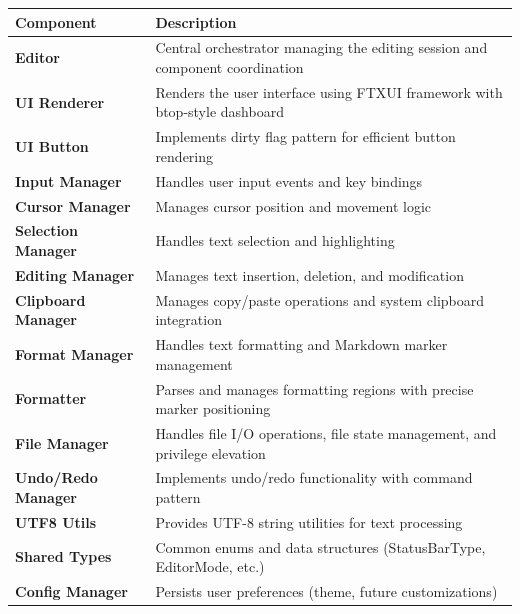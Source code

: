 \documentclass[12pt,a4paper,oneside,openany]{report}
\begin{document}
\begin{table}[H]
	\centering
	\begin{tabular}{|p{5cm}|p{8cm}|}
		\hline
		\textbf{Component}         & \textbf{Description}                                                         \\
		\hline
		\textbf{Editor}            & Central orchestrator managing the editing session and component coordination \\
		\hline
		\textbf{UI Renderer}       & Renders the user interface using FTXUI framework with btop-style dashboard   \\
		\hline
		\textbf{UI Button}         & Implements dirty flag pattern for efficient button rendering                 \\
		\hline
		\textbf{Input Manager}     & Handles user input events and key bindings                                   \\
		\hline
		\textbf{Cursor Manager}    & Manages cursor position and movement logic                                   \\
		\hline
		\textbf{Selection Manager} & Handles text selection and highlighting                                      \\
		\hline
		\textbf{Editing Manager}   & Manages text insertion, deletion, and modification                           \\
		\hline
		\textbf{Clipboard Manager} & Manages copy/paste operations and system clipboard integration               \\
		\hline
		\textbf{Format Manager}    & Handles text formatting and Markdown marker management                       \\
		\hline
		\textbf{Formatter}         & Parses and manages formatting regions with precise marker positioning        \\
		\hline
		\textbf{File Manager}      & Handles file I/O operations, file state management, and privilege elevation \\
		\hline
		\textbf{Undo/Redo Manager} & Implements undo/redo functionality with command pattern                      \\
		\hline
		\textbf{UTF8 Utils}        & Provides UTF-8 string utilities for text processing                          \\
		\hline
		\textbf{Shared Types}      & Common enums and data structures (StatusBarType, EditorMode, etc.)           \\
		\hline
		\textbf{Config Manager}    & Persists user preferences (theme, future customizations)                     \\
		\hline
	\end{tabular}
\end{table}
\end{document}
